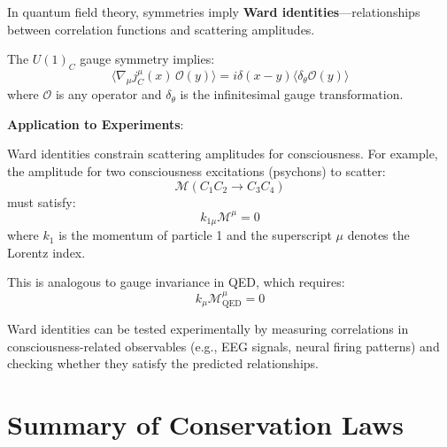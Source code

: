 In quantum field theory, symmetries imply \textbf{Ward identities}---relationships between correlation functions and scattering amplitudes.

\begin{theorem}\label{thm:ward-identity-consciousness}
The $U(1)_C$ gauge symmetry implies:
\begin{equation}
\langle \nabla_\mu j^\mu_C(x) \, \mathcal{O}(y) \rangle = i \delta(x-y) \langle \delta_\theta \mathcal{O}(y) \rangle
\end{equation}
where $\mathcal{O}$ is any operator and $\delta_\theta$ is the infinitesimal gauge transformation.
\end{theorem}

\begin{level2}
\textbf{Application to Experiments}:

Ward identities constrain scattering amplitudes for consciousness. For example, the amplitude for two consciousness excitations (psychons) to scatter:
\begin{equation}
\mathcal{M}(C_1 C_2 \to C_3 C_4)
\end{equation}
must satisfy:
\begin{equation}
k_{1\mu} \mathcal{M}^\mu = 0
\end{equation}
where $k_1$ is the momentum of particle 1 and the superscript $\mu$ denotes the Lorentz index.

This is analogous to gauge invariance in QED, which requires:
\begin{equation}
k_\mu \mathcal{M}^\mu_{\text{QED}} = 0
\end{equation}

Ward identities can be tested experimentally by measuring correlations in consciousness-related observables (e.g., EEG signals, neural firing patterns) and checking whether they satisfy the predicted relationships.
\end{level2}

\section{Summary of Conservation Laws}

